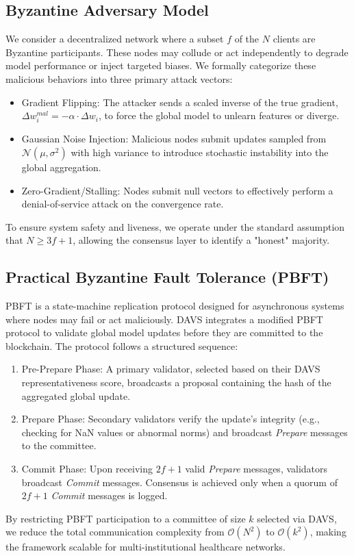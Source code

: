 \documentclass[conference]{IEEEtran}
\begin{document}
\subsection{Byzantine Adversary Model}
We consider a decentralized network where a subset $f$ of the $N$ clients are Byzantine participants. These nodes may collude or act independently to degrade model performance or inject targeted biases. We formally categorize these malicious behaviors into three primary attack vectors:
\begin{itemize}
    \item Gradient Flipping: The attacker sends a scaled inverse of the true gradient, $\Delta w_{i}^{mal} = -\alpha \cdot \Delta w_i$, to force the global model to unlearn features or diverge.
    \item Gaussian Noise Injection: Malicious nodes submit updates sampled from $\mathcal{N}(\mu, \sigma^2)$ with high variance to introduce stochastic instability into the global aggregation.
    \item Zero-Gradient/Stalling: Nodes submit null vectors to effectively perform a denial-of-service attack on the convergence rate.
\end{itemize}
To ensure system safety and liveness, we operate under the standard assumption that $N \geq 3f + 1$, allowing the consensus layer to identify a "honest" majority.

\subsection{Practical Byzantine Fault Tolerance (PBFT)}
PBFT is a state-machine replication protocol designed for asynchronous systems where nodes may fail or act maliciously. DAVS integrates a modified PBFT protocol to validate global model updates before they are committed to the blockchain. The protocol follows a structured sequence:
\begin{enumerate}
    \item Pre-Prepare Phase: A primary validator, selected based on their DAVS representativeness score, broadcasts a proposal containing the hash of the aggregated global update.
    \item Prepare Phase: Secondary validators verify the update's integrity (e.g., checking for NaN values or abnormal norms) and broadcast \textit{Prepare} messages to the committee.
    \item Commit Phase: Upon receiving $2f+1$ valid \textit{Prepare} messages, validators broadcast \textit{Commit} messages. Consensus is achieved only when a quorum of $2f+1$ \textit{Commit} messages is logged.
\end{enumerate}
By restricting PBFT participation to a committee of size $k$ selected via DAVS, we reduce the total communication complexity from $\mathcal{O}(N^2)$ to $\mathcal{O}(k^2)$, making the framework scalable for multi-institutional healthcare networks.
\end{document}
